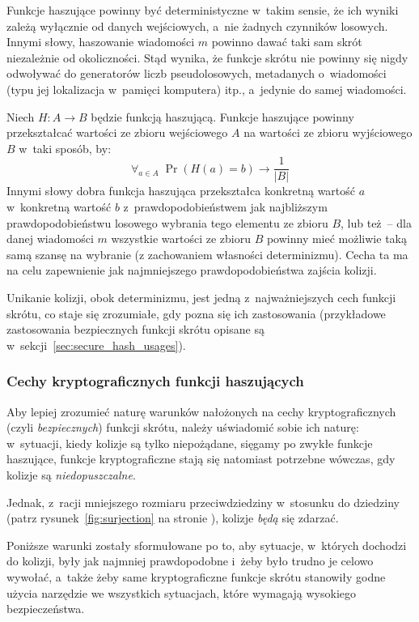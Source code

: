 Funkcje haszujące powinny być deterministyczne w~takim sensie, że ich wyniki
zależą wyłącznie od danych wejściowych, a~nie żadnych czynników losowych.
Innymi słowy, haszowanie wiadomości $m$ powinno dawać taki sam skrót
niezależnie od okoliczności. Stąd wynika, że funkcje skrótu nie powinny się
nigdy odwoływać do generatorów liczb pseudolosowych, metadanych o~wiadomości
(typu jej lokalizacja w~pamięci komputera) itp., a~jedynie do samej wiadomości.

Niech $H : A \to B$ będzie funkcją haszującą. Funkcje haszujące powinny
przekształcać wartości ze zbioru wejściowego $A$ na wartości ze zbioru
wyjściowego $B$ w~taki sposób, by:
\[
    \forall_{a \in A} \; \Pr(H(a) = b) \to \frac{1}{|B|}
\]
Innymi słowy dobra funkcja haszująca przekształca konkretną wartość $a$
w~konkretną wartość $b$ z~prawdopodobieństwem jak najbliższym
prawdopodobieństwu losowego wybrania tego elementu ze zbioru $B$, lub też~--
dla danej wiadomości $m$ wszystkie wartości ze zbioru $B$ powinny mieć możliwie
taką samą szansę na wybranie (z zachowaniem własności determinizmu). Cecha ta
ma na celu zapewnienie jak najmniejszego prawdopodobieństwa zajścia kolizji.

Unikanie kolizji, obok determinizmu, jest jedną z~najważniejszych cech funkcji
skrótu, co staje się zrozumiałe, gdy pozna się ich zastosowania (przykładowe
zastosowania bezpiecznych funkcji skrótu opisane są
w~sekcji~\ref{sec:secure_hash_usages}).



\subsubsection{Cechy kryptograficznych funkcji haszujących}
\label{sec:secure_hash_attributes}%
Aby lepiej zrozumieć naturę warunków nałożonych na cechy kryptograficznych
(czyli \emph{bezpiecznych}) funkcji skrótu, należy uświadomić sobie ich naturę:
w~sytuacji, kiedy kolizje są tylko niepożądane, sięgamy po zwykłe funkcje
haszujące, funkcje kryptograficzne stają się natomiast potrzebne wówczas, gdy
kolizje są \emph{niedopuszczalne}.

Jednak, z~racji mniejszego rozmiaru przeciwdziedziny w~stosunku do dziedziny
(patrz rysunek~\ref{fig:surjection} na stronie \pageref{fig:surjection}),
kolizje \emph{będą} się zdarzać.

Poniższe warunki zostały sformułowane po to, aby sytuacje, w~których dochodzi
do kolizji, były jak najmniej prawdopodobne i~żeby było trudno je celowo
wywołać, a~także żeby same kryptograficzne funkcje skrótu stanowiły godne
użycia narzędzie we wszystkich sytuacjach, które wymagają wysokiego
bezpieczeństwa.

